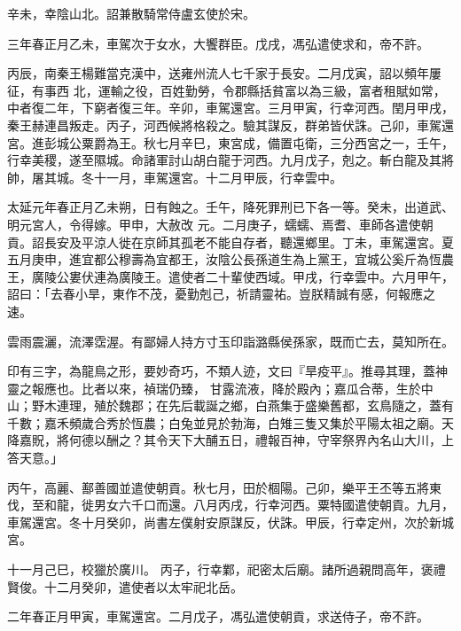 \begin{pinyinscope}
 辛未，幸陰山北。詔兼散騎常侍盧玄使於宋。



 三年春正月乙未，車駕次于女水，大饗群臣。戊戌，馮弘遣使求和，帝不許。



 丙辰，南秦王楊難當克漢中，送雍州流人七千家于長安。二月戊寅，詔以頻年屢征，有事西
 北，運輸之役，百姓勤勞，令郡縣括貧富以為三級，富者租賦如常，中者復二年，下窮者復三年。辛卯，車駕還宮。三月甲寅，行幸河西。閏月甲戌，秦王赫連昌叛走。丙子，河西候將格殺之。驗其謀反，群弟皆伏誅。己卯，車駕還宮。進彭城公粟爵為王。秋七月辛巳，東宮成，備置屯衛，三分西宮之一，壬午，行幸美稷，遂至隰城。命諸軍討山胡白龍于河西。九月戊子，剋之。斬白龍及其將帥，屠其城。冬十一月，車駕還宮。十二月甲辰，行幸雲中。



 太延元年春正月乙未朔，日有蝕之。壬午，降死罪刑已下各一等。癸未，出道武、明元宮人，令得嫁。甲申，大赦改
 元。二月庚子，蠕蠕、焉耆、車師各遣使朝貢。詔長安及平涼人徙在京師其孤老不能自存者，聽還鄉里。丁未，車駕還宮。夏五月庚申，進宜都公穆壽為宜都王，汝陰公長孫道生為上黨王，宜城公奚斤為恆農王，廣陵公婁伏連為廣陵王。遣使者二十輩使西域。甲戌，行幸雲中。六月甲午，詔曰：「去春小旱，東作不茂，憂勤剋己，祈請靈祐。豈朕精誠有感，何報應之速。



 雲雨震灑，流澤霑渥。有鄙婦人持方寸玉印詣潞縣侯孫家，既而亡去，莫知所在。



 印有三字，為龍鳥之形，要妙奇巧，不類人迹，文曰『旱疫平』。推尋其理，蓋神靈之報應也。比者以來，禎瑞仍臻，
 甘露流液，降於殿內；嘉瓜合蒂，生於中山；野木連理，殖於魏郡；在先后載誕之鄉，白燕集于盛樂舊都，玄鳥隨之，蓋有千數；嘉禾頻歲合秀於恆農；白兔並見於勃海，白雉三隻又集於平陽太祖之廟。天降嘉貺，將何德以酬之？其令天下大酺五日，禮報百神，守宰祭界內名山大川，上答天意。」



 丙午，高麗、鄯善國並遣使朝貢。秋七月，田於棝陽。己卯，樂平王丕等五將東伐，至和龍，徙男女六千口而還。八月丙戌，行幸河西。粟特國遣使朝貢。九月，車駕還宮。冬十月癸卯，尚書左僕射安原謀反，伏誅。甲辰，行幸定州，次於新城宮。



 十一月己巳，校獵於廣川。
 丙子，行幸鄴，祀密太后廟。諸所過親問高年，褒禮賢俊。十二月癸卯，遣使者以太牢祀北岳。



 二年春正月甲寅，車駕還宮。二月戊子，馮弘遣使朝貢，求送侍子，帝不許。




\end{pinyinscope}
